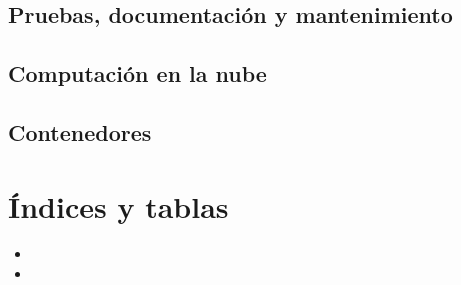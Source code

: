 \documentclass[a4paper,11pt,spanish]{sphinxmanual}
\begin{document}
\chapter{Pruebas, documentación y mantenimiento}
\label{\detokenize{yii2:pruebas-documentacion-y-mantenimiento}}

\chapter{Computación en la nube}
\label{\detokenize{yii2:computacion-en-la-nube}}

\chapter{Contenedores}
\label{\detokenize{yii2:contenedores}}

\part{Índices y tablas}
\label{\detokenize{index_latex:indices-y-tablas}}\begin{itemize}
\item {} 

\item {} 

\end{itemize}



\renewcommand{\indexname}{Índice}
\printindex
\end{document}
